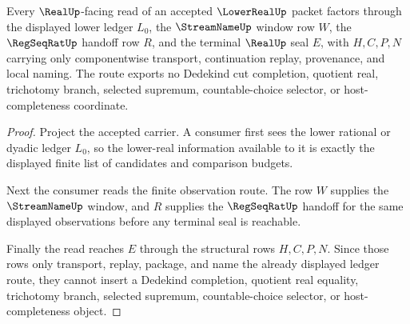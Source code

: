 \begin{theorem}
\label{thm:lower-real-realup-handoff}
Every $\RealUp$-facing read of an accepted $\LowerRealUp$ packet factors through the displayed lower ledger $L_0$, the $\StreamNameUp$ window row $W$, the $\RegSeqRatUp$ handoff row $R$, and the terminal $\RealUp$ seal $E$, with $H,C,P,N$ carrying only componentwise transport, continuation replay, provenance, and local naming. The route exports no Dedekind cut completion, quotient real, trichotomy branch, selected supremum, countable-choice selector, or host-completeness coordinate.
\end{theorem}
\begin{proof}
Project the accepted carrier. A consumer first sees the lower rational or dyadic ledger $L_0$, so the lower-real information available to it is exactly the displayed finite list of candidates and comparison budgets.

Next the consumer reads the finite observation route. The row $W$ supplies the $\StreamNameUp$ window, and $R$ supplies the $\RegSeqRatUp$ handoff for the same displayed observations before any terminal seal is reachable.

Finally the read reaches $E$ through the structural rows $H,C,P,N$. Since those rows only transport, replay, package, and name the already displayed ledger route, they cannot insert a Dedekind completion, quotient real equality, trichotomy branch, selected supremum, countable-choice selector, or host-completeness object.
\end{proof}

